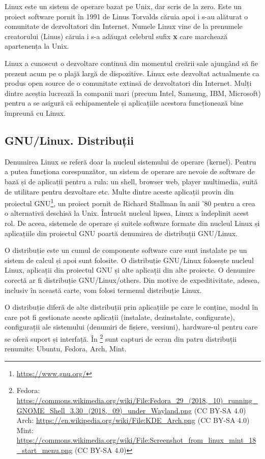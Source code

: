 Linux este un sistem de operare bazat pe Unix, dar scris de la zero. Este un proiect software pornit în 1991 de Linus Torvalds căruia apoi i s-au alăturat o comunitate de dezvoltatori din Internet. Numele Linux vine de la prenumele creatorului (Linus) căruia i s-a adăugat celebrul sufix \textbf{x} care marchează apartenența la Unix.

Linux a cunoscut o dezvoltare continuă din momentul creării sale ajungând să fie prezent acum pe o plajă largă de dispozitive. Linux este dezvoltat actualmente ca produs open source de o comunitate extinsă de dezvoltatori din Internet. Mulți dintre aceștia lucrează la companii mari (precum Intel, Samsung, IBM, Microsoft) pentru a se asigură că echipamentele și aplicațiile acestora funcționează bine împreună cu Linux.

\subsection{GNU/Linux. Distribuții}
\label{sec:intro:distros}

Denumirea Linux se referă doar la nucleul sistemului de operare (kernel). Pentru a putea funcționa corespunzător, un sistem de operare are nevoie de software de bază și de aplicații pentru a rula: un shell, browser web, player multimedia, suită de utilitare pentru dezvoltare etc. Multe dintre aceste aplicații provin din proiectul GNU\footnote{\url{https://www.gnu.org/}}, un proiect pornit de Richard Stallman în anii '80 pentru a crea o alternativă deschisă la Unix. Întrucât nucleul lipsea, Linux a îndeplinit acest rol. De aceea, sistemele de operare și suitele software formate din nucleul Linux și aplicațiile din proiectul GNU poartă denumirea de distribuții GNU/Linux.

O distribuție este un cumul de componente software care sunt instalate pe un sistem de calcul și apoi sunt folosite. O distribuție GNU/Linux folosește nucleul Linux, aplicații din proiectul GNU și alte aplicații din alte proiecte. O denumire corectă ar fi distribuție GNU/Linux/others. Din motive de expeditivitate, adesea, inclusiv în această carte, vom folosi termenul distribuție Linux.

O distribuție diferă de alte distribuții prin aplicațiile pe care le conține, modul în care pot fi gestionate aceste aplicații (instalate, dezinstalate, configurate), configurații ale sistemului (denumiri de fișiere, versiuni), hardware-ul pentru care se oferă suport și interfață. În \footnote{Fedora: \url{https://commons.wikimedia.org/wiki/File:Fedora_29_(2018,_10)_running_GNOME_Shell_3.30_(2018,_09)_under_Wayland.png} (CC BY-SA 4.0)\\Arch: \url{https://en.wikipedia.org/wiki/File:KDE_Arch.png} (CC BY-SA 4.0)\\Mint: \url{https://commons.wikimedia.org/wiki/File:Screenshot_from_linux_mint_18_start_menu.png} (CC BY-SA 4.0)} sunt capturi de ecran din patru distribuții renumite: Ubuntu, Fedora, Arch, Mint.

